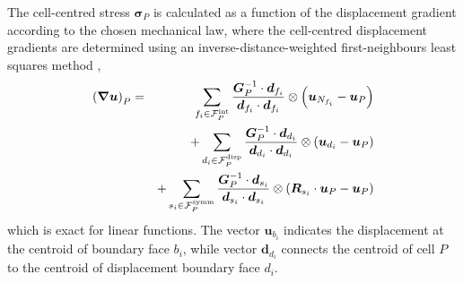 \documentclass[sn-mathphys,Numbered]{sn-jnl}%
\newcommand{\bb}{\boldsymbol}
\begin{document}
The cell-centred stress $\bb{\sigma}_P$ is calculated as a function of the displacement gradient according to the chosen mechanical law, where the cell-centred displacement gradients are determined using an inverse-distance-weighted first-neighbours least squares method \citep{Jasak1996},
\begin{eqnarray} \label{eq:leastSquaresGrad}
	\left(\bb{\nabla}\bb{u}\right)_P
		&=&\sum_{f_i \in \mathcal{F}^{\text{int}}_P} \frac{\bb{G}^{-1}_P \cdot \bb{d}_{f_i}}{\bb{d}_{f_i} \cdot \bb{d}_{f_i}}  \otimes \left(\bb{u}_{N_{f_i}} - \bb{u}_P \right) \notag \\
		&&+ \sum_{d_i \in \mathcal{F}^{\text{disp}}_P} \frac{ \bb{G}^{-1}_P \cdot \bb{d}_{d_i} }{\bb{d}_{d_i} \cdot \bb{d}_{d_i}} \otimes \left(\bb{u}_{d_i} - \bb{u}_P \right) \notag \\
		&&+ \sum_{s_i \in \mathcal{F}^{\text{symm}}_P} \frac{\bb{G}^{-1}_P \cdot \bb{d}_{s_i}}{\bb{d}_{s_i} \cdot \bb{d}_{s_i}} \otimes \left(\bb{R}_{s_i} \cdot \bb{u}_P - \bb{u}_P \right)
\end{eqnarray}
which is exact for linear functions.
The vector $\bb{u}_{b_i}$ indicates the displacement at the centroid of boundary face ${b_i}$, while vector $\bb{d}_{d_i}$ connects the centroid of cell $P$ to the centroid of displacement boundary face $d_i$.
\end{document}
